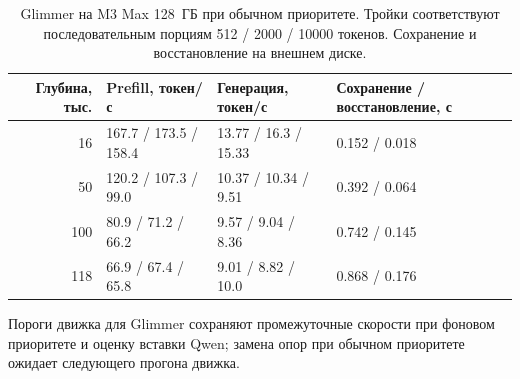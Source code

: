 \begin{table}[t]
\centering
\caption{Glimmer на M3 Max 128~ГБ при обычном приоритете. Тройки соответствуют последовательным порциям
512 / 2000 / 10000 токенов. Сохранение и восстановление на внешнем диске.}
\label{tab:glimmer-pri31}
\footnotesize
\begin{tabular}{rlll}
\toprule
Глубина, тыс. & Prefill, токен/с & Генерация, токен/с & Сохранение / восстановление, с \\
\midrule
16 & 167.7 / 173.5 / 158.4 & 13.77 / 16.3 / 15.33 & 0.152 / 0.018 \\
50 & 120.2 / 107.3 / 99.0 & 10.37 / 10.34 / 9.51 & 0.392 / 0.064 \\
100 & 80.9 / 71.2 / 66.2 & 9.57 / 9.04 / 8.36 & 0.742 / 0.145 \\
118 & 66.9 / 67.4 / 65.8 & 9.01 / 8.82 / 10.0 & 0.868 / 0.176 \\
\bottomrule
\end{tabular}
\end{table}

Пороги движка для Glimmer сохраняют промежуточные скорости при фоновом приоритете и оценку вставки Qwen;
замена опор при обычном приоритете ожидает следующего прогона движка.
